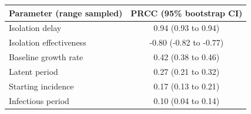 \begin{tabular}{@{}lc@{}}
\toprule
Parameter (range sampled) & PRCC (95\% bootstrap CI) \\
\midrule
Isolation delay & 0.94 (0.93 to 0.94) \\
Isolation effectiveness & -0.80 (-0.82 to -0.77) \\
Baseline growth rate & 0.42 (0.38 to 0.46) \\
Latent period & 0.27 (0.21 to 0.32) \\
Starting incidence & 0.17 (0.13 to 0.21) \\
Infectious period & 0.10 (0.04 to 0.14) \\
\bottomrule
\end{tabular}
